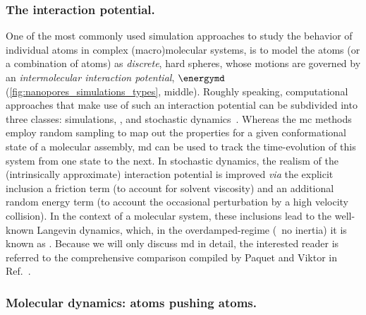 \subsubsection{The interaction potential.}
%

One of the most commonly used simulation approaches to study the behavior of individual atoms in complex
(macro)molecular systems, is to model the atoms (or a combination of atoms) as \emph{discrete}, hard spheres,
whose motions are governed by an \emph{intermolecular interaction potential}, $\energymd$
(\cref{fig:nanopores_simulations_types}, middle). Roughly speaking, computational approaches that make use of
such an interaction potential can be subdivided into three classes:  simulations, ,
and stochastic dynamics~\cite{Paquet-2015}. Whereas the \gls{mc} methods employ random sampling to map out the
properties for a given conformational state of a molecular assembly, \gls{md} can be used to track the
time-evolution of this system from one state to the next. In stochastic dynamics, the realism of the
(intrinsically approximate) interaction potential is improved \textit{via} the explicit inclusion a friction
term (to account for solvent viscosity) and an additional random energy term (to account the occasional
perturbation by a high velocity collision). In the context of a molecular system, these inclusions lead to
the well-known Langevin dynamics, which, in the overdamped-regime (\ie~no inertia) it is known as
. Because we will only discuss \gls{md} in detail, the interested reader is referred to the
comprehensive comparison compiled by Paquet and Viktor in Ref.~\cite{Paquet-2015}.

\subsubsection{Molecular dynamics: atoms pushing atoms.}
%

